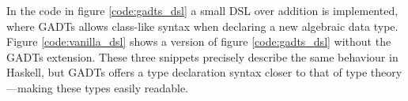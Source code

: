 \noindent
In the code in figure \ref{code:gadts_dsl} a small DSL over addition is implemented, where GADTs allows class-like syntax when declaring a new algebraic data type.
Figure \ref{code:vanilla_dsl} shows a version of figure \ref{code:gadts_dsl} without the GADTs extension. These three snippets precisely describe the same behaviour in Haskell, but GADTs offers a type declaration syntax closer to that of type theory---making these types easily readable. 

